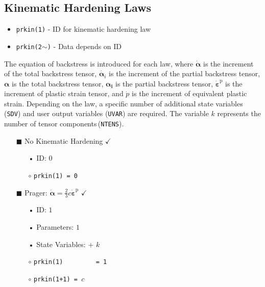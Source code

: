 \documentclass[11pt,a4paper,twoside,final,onecolumn,titlepage]{article}
\newcommand{\verified}{\hspace{0.5pt} {\LARGE $\checkmark$}}
\begin{document}
\vspace{0.2cm}
\subsection{Kinematic Hardening Laws}
\vspace{0.2cm}

\begin{itemize}
	\item \texttt{prkin(1)} - ID for kinematic hardening law
	\item \texttt{prkin(2$\mathtt{\sim}$)} - Data depends on ID
\end{itemize}

\noindent The equation of backstress is introduced for each law, where $\dot{\bm{\alpha}}$ is the increment of the total backstress tensor, $\dot{\bm{\alpha}_i}$ is the increment of the partial backstress tensor, $\bm{\alpha}$ is the total backstress tensor, $\bm{\alpha_i}$ is the partial backstress tensor, $\dot{\bm{\varepsilon}}^\textrm{p}$ is the increment of plastic strain tensor, and $\dot{p}$ is the increment of equivalent plastic strain. Depending on the law, a specific number of additional state variables (\texttt{SDV}) and user output variables (\texttt{UVAR}) are required. The variable $k$ represents the number of tensor components\,(\texttt{NTENS}).
\vspace{0.1cm}

\begin{itemize}
	\item[\tiny$\blacksquare$] No Kinematic Hardening \verified{}
	\begin{itemize}
		\item[•] ID: $0$\\
		\item[$\circ$] \texttt{prkin(1) = 0}
	\end{itemize}
\end{itemize}

\begin{itemize}
	\item[\tiny$\blacksquare$] Prager: $\displaystyle \dot{\bm{\alpha}}=\frac{2}{3}c\dot{\bm{\varepsilon}}^\textrm{p}$ \verified{}
	\begin{itemize}
		\item[•] ID: $1$
		\item[•] Parameters: $1$
		\item[•] State Variables: + $k$\\
		\item[$\circ$] \texttt{prkin(1)\,\,\,\,\,\,\,\,\,= 1}
		\item[$\circ$] \texttt{prkin(1+1) = $c$}\\
	\end{itemize}
\end{itemize}
\end{document}
